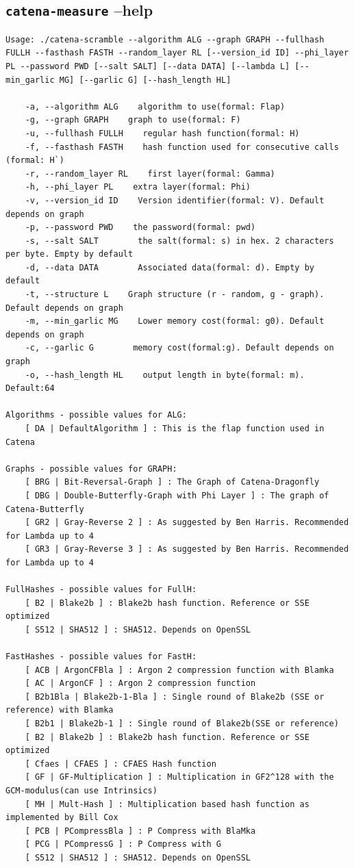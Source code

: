 \begin{appendix}
\appendix

\chapter{\texttt{catena-measure} --help}
\label{chap:app-measure}

\begin{lstlisting}[]
Usage: ./catena-scramble --algorithm ALG --graph GRAPH --fullhash FULLH --fasthash FASTH --random_layer RL [--version_id ID] --phi_layer PL --password PWD [--salt SALT] [--data DATA] [--lambda L] [--min_garlic MG] [--garlic G] [--hash_length HL]

    -a, --algorithm ALG    algorithm to use(formal: Flap)
    -g, --graph GRAPH    graph to use(formal: F)
    -u, --fullhash FULLH    regular hash function(formal: H)
    -f, --fasthash FASTH    hash function used for consecutive calls (formal: H`)
    -r, --random_layer RL    first layer(formal: Gamma)
    -h, --phi_layer PL    extra layer(formal: Phi)
    -v, --version_id ID    Version identifier(formal: V). Default depends on graph
    -p, --password PWD    the password(formal: pwd)
    -s, --salt SALT        the salt(formal: s) in hex. 2 characters per byte. Empty by default
    -d, --data DATA        Associated data(formal: d). Empty by default
    -t, --structure L    Graph structure (r - random, g - graph). Default depends on graph
    -m, --min_garlic MG    Lower memory cost(formal: g0). Default depends on graph
    -c, --garlic G        memory cost(formal:g). Default depends on graph
    -o, --hash_length HL    output length in byte(formal: m). Default:64

Algorithms - possible values for ALG:
    [ DA | DefaultAlgorithm ] : This is the flap function used in Catena

Graphs - possible values for GRAPH:
    [ BRG | Bit-Reversal-Graph ] : The Graph of Catena-Dragonfly
    [ DBG | Double-Butterfly-Graph with Phi Layer ] : The graph of Catena-Butterfly
    [ GR2 | Gray-Reverse 2 ] : As suggested by Ben Harris. Recommended for Lambda up to 4
    [ GR3 | Gray-Reverse 3 ] : As suggested by Ben Harris. Recommended for Lambda up to 4

FullHashes - possible values for FullH:
    [ B2 | Blake2b ] : Blake2b hash function. Reference or SSE optimized
    [ S512 | SHA512 ] : SHA512. Depends on OpenSSL

FastHashes - possible values for FastH:
    [ ACB | ArgonCFBla ] : Argon 2 compression function with Blamka
    [ AC | ArgonCF ] : Argon 2 compression function
    [ B2b1Bla | Blake2b-1-Bla ] : Single round of Blake2b (SSE or reference) with Blamka
    [ B2b1 | Blake2b-1 ] : Single round of Blake2b(SSE or reference)
    [ B2 | Blake2b ] : Blake2b hash function. Reference or SSE optimized
    [ Cfaes | CFAES ] : CFAES Hash function
    [ GF | GF-Multiplication ] : Multiplication in GF2^128 with the GCM-modulus(can use Intrinsics)
    [ MH | Mult-Hash ] : Multiplication based hash function as implemented by Bill Cox
    [ PCB | PCompressBla ] : P Compress with BlaMka
    [ PCG | PCompressG ] : P Compress with G
    [ S512 | SHA512 ] : SHA512. Depends on OpenSSL


\end{lstlisting}
\end{appendix}

